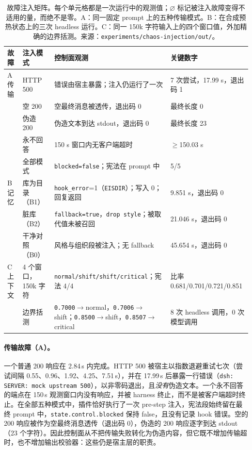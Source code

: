\begin{table}[t]
\centering\footnotesize\setlength{\tabcolsep}{3pt}
\caption{故障注入矩阵。每个单元格都是一次运行中的观测值；$\varnothing$ 标记被注入故障变得不适用的量，而绝不是零。A：同一固定 prompt 上的五种传输模式。B：在合成预热状态上的三次 headless 运行。C：同一 150k 字符输入上的四个窗口值，外加精确的边界括测。来源：\texttt{experiments/\allowbreak{}chaos-\allowbreak{}injection/\allowbreak{}out/\allowbreak{}}。}
\begin{tabular}{@{}l l p{} p{}@{}}
\toprule
故障 & 注入模式 & 控制面观测 & 关键数字 \\
\midrule
A 传输 & HTTP 500 & 错误由宿主暴露；注入仍运行了一次 & 7 次尝试，17.99 s，退出码 1 \\
        & 空 200 & 空最终消息被透传，退出码 0 & 最终长度 0 \\
        & 伪造 200 & 伪造文本到达 stdout，退出码 0 & 最终长度 23 \\
        & 永不回答 & 150 s 窗口内无客户端超时 & $\ge$150.03 s \\
        & 全部模式 & \texttt{blocked=false}；宪法在 prompt 中 & 5/5 \\
B 记忆 & 库为目录（B1） & \texttt{hook\_error}=1（\texttt{EISDIR}）；写入 0；回复返回 & 9.851 s，退出码 0 \\
        & 脏库（B2） & \texttt{fallback=true}，\texttt{drop style}；被取代值未被召回 & 21.046 s，退出码 0 \\
        & 干净对照（B0） & 风格与组织段被注入；无 fallback & 45.654 s，退出码 0 \\
C 上下文 & 4 个窗口，150k 字符 & \texttt{normal/\allowbreak{}shift/\allowbreak{}shift/\allowbreak{}critical}；宪法 4/4 & 比率 0.681/0.701/0.721/0.851 \\
        & 边界括测 & \texttt{0.7000}$\to$normal，\texttt{0.7006}$\to$shift；\texttt{0.8500}$\to$shift，\texttt{0.8507}$\to$critical & 8 次 headless 调用，0 次模型调用 \\
\bottomrule
\end{tabular}
\end{table}

\paragraph{传输故障（A）。} 一个普通 200 响应在 2.84\,s 内完成。HTTP 500 被宿主以指数退避重试七次（尝试间隔 0.55、0.96、1.92、4.25、7.51\,s），并在 17.99\,s 后暴露一行错误（\texttt{dsh:\allowbreak{} SERVER:\allowbreak{} mock upstream 500}），以非零码退出，且\emph{没有}伪造文本。一个永不回答的端点在 150\,s 观测窗口内没有响应，并被 harness 终止，而不是被客户端超时终止。在全部五种模式中，插件恰好执行了一次 pre-step 注入，宪法段始终留在最终 prompt 中，\texttt{state.\allowbreak{}control.\allowbreak{}blocked} 保持 false，且没有记录 hook 错误。空的 200 响应被作为空最终消息透传（退出码 0），伪造的 200 响应逐字到达 stdout（23 个字符）。因此控制面从不把传输失败转化为伪造内容，但它既不增加传输超时，也不增加输出校验器：这些仍是宿主层的职责。

